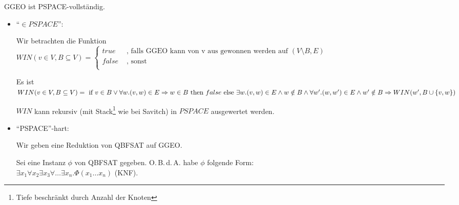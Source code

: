 \begin{satz}

    GGEO ist PSPACE-vollständig.

\end{satz}

\begin{beweis}

    \begin{itemize}

        \item ``$\in PSPACE$'':

        Wir betrachten die Funktion
        \\
        $ WIN(v \in V, B \subseteq V) =
        \begin{cases}
        true         & \text{ , falls GGEO kann von v aus gewonnen werden auf  } (V \setminus B, E)     \\
        false         &  \text{ , sonst }    \\
        \end{cases}
        $

        Es ist $WIN(v \in V, B \subseteq V) =
        \\\text{ if } v \in B \lor \forall w. (v,w) \in E \Rightarrow w \in B
        \\\text{ then } false
        \\\text{ else } \exists w . (v,w) \in E \land w \notin B \land \forall w' . (w,w') \in E \land w' \notin B \Rightarrow WIN(w', B \cup \{ v,w \})$

        $WIN$ kann rekursiv (mit Stack\footnote{Tiefe beschränkt durch Anzahl der Knoten} wie bei Savitch) in $PSPACE$ ausgewertet werden.




        \item ``PSPACE''-hart:

        Wir geben eine Reduktion von QBFSAT auf GGEO.

        Sei eine Instanz $\phi$ von QBFSAT gegeben. O.\,B.\,d.\,A. habe $\phi$ folgende Form:
        \\
         $\exists x_1 \forall x_2 \exists x_3 \forall \dots \exists x_n . \Phi(x_1 \dots x_n)$ (KNF).


    \end{itemize}

\end{beweis}





